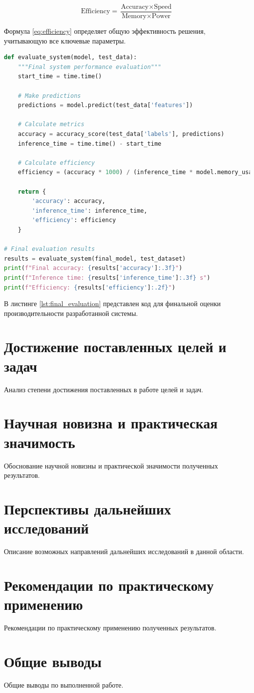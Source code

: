 \begin{equation}
\text{Efficiency} = \frac{\text{Accuracy} \times \text{Speed}}{\text{Memory} \times \text{Power}}
\label{eq:efficiency}
\end{equation}

Формула \ref{eq:efficiency} определяет общую эффективность решения, учитывающую все ключевые параметры.

\begin{lstlisting}[style=code, language=Python, caption={Финальная оценка системы}, label={lst:final_evaluation}]
def evaluate_system(model, test_data):
    """Final system performance evaluation"""
    start_time = time.time()
    
    # Make predictions
    predictions = model.predict(test_data['features'])
    
    # Calculate metrics
    accuracy = accuracy_score(test_data['labels'], predictions)
    inference_time = time.time() - start_time
    
    # Calculate efficiency
    efficiency = (accuracy * 1000) / (inference_time * model.memory_usage)
    
    return {
        'accuracy': accuracy,
        'inference_time': inference_time,
        'efficiency': efficiency
    }

# Final evaluation results
results = evaluate_system(final_model, test_dataset)
print(f"Final accuracy: {results['accuracy']:.3f}")
print(f"Inference time: {results['inference_time']:.3f} s")
print(f"Efficiency: {results['efficiency']:.2f}")
\end{lstlisting}

В листинге \ref{lst:final_evaluation} представлен код для финальной оценки производительности разработанной системы.

\section{Достижение поставленных целей и задач}

Анализ степени достижения поставленных в работе целей и задач.

\section{Научная новизна и практическая значимость}

Обоснование научной новизны и практической значимости полученных результатов.

\section{Перспективы дальнейших исследований}

Описание возможных направлений дальнейших исследований в данной области.

\section{Рекомендации по практическому применению}

Рекомендации по практическому применению полученных результатов.

\section{Общие выводы}

Общие выводы по выполненной работе.
